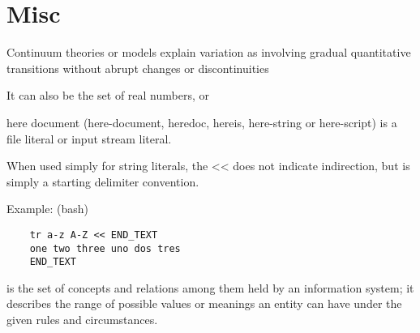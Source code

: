 \section{Misc}

\begin{definition}[Continuum]
    Continuum theories or models explain variation as involving gradual
    quantitative transitions without abrupt changes or discontinuities

    It can also be the set of real numbers, or 

\end{definition}

\begin{definition}
    here document (here-document, heredoc, hereis, here-string or here-script) is
    a file literal or input stream literal.

    When used simply for string literals, the << does not indicate indirection,
    but is simply a starting delimiter convention. 

    Example: (bash) 
\begin{verbatim}
    tr a-z A-Z << END_TEXT 
    one two three uno dos tres
    END_TEXT
\end{verbatim}

\end{definition}

\begin{definition}
    is the set of concepts and relations among them held by an information
    system; it describes the range of possible values or meanings an entity can
    have under the given rules and circumstances.

\end{definition}
